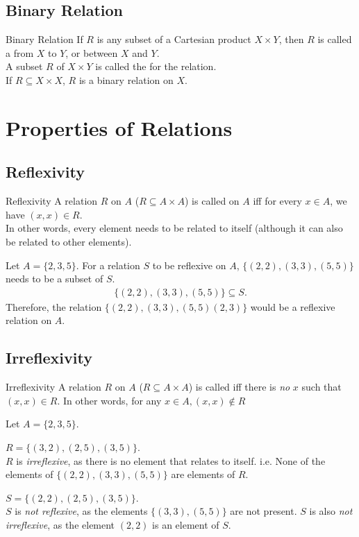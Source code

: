\documentclass[\main/notes.tex]{subfiles}
\begin{document}
			\subsection{Binary Relation}
				\begin{definition}{Binary Relation}
					If $R$ is any subset of a Cartesian product $X \times Y$, then $R$ is called a  from $X$ to $Y$, or between $X$ and $Y$.\\
					A subset $R$ of $X \times Y$ is called the  for the relation.\\
					If $R \subseteq X \times X$, $R$ is a binary relation on $X$.
				\end{definition}
			\pagebreak
		\section{Properties of Relations}
			\subsection{Reflexivity}
			\begin{definition}{Reflexivity}
				A relation $R$ on $A$ ($R \subseteq A \times A$) is called  on $A$ iff for every $x \in A$, we have $(x, x) \in R$.\\
				In other words, every element needs to be related to itself (although it can also be related to other elements).
			\end{definition}
				\begin{example}
					Let $A = \{2, 3, 5\}$. For a relation $S$ to be reflexive on $A$, $\bigl\{(2, 2), (3, 3), (5, 5)\bigr\}$ needs to be a subset of $S$.
						\begin{align*}
							\bigl\{(2, 2), (3, 3), (5, 5)\bigr\} \subseteq S.
						\end{align*}
					Therefore, the relation $\bigl\{(2, 2), (3, 3), (5, 5) (2, 3)\bigr\}$ would be a reflexive relation on $A$.
				\end{example}
			\subsection{Irreflexivity}
				\begin{definition}{Irreflexivity}
					A relation $R$ on $A$ ($R \subseteq A \times A$) is called  iff there is \emph{no} $x$ such that $(x, x) \in R$. In other words, for any $x \in A, (x, x) \notin R$
				\end{definition}
				\begin{example}
					Let $A = \{2, 3, 5\}$.

					$R = \bigl\{(3, 2), (2, 5), (3, 5)\bigr\}$.\\
					$R$ is \emph{irreflexive}, as there is no element that relates to itself. i.e. None of the elements of $\bigl\{(2, 2), (3, 3), (5, 5)\bigr\}$ are elements of $R$.

					$S = \bigl\{(2, 2), (2, 5), (3, 5)\bigr\}$.\\
					$S$ is \emph{not reflexive}, as the elements $\bigl\{(3, 3), (5, 5)\bigr\}$ are not present. $S$ is also \emph{not irreflexive}, as the element $(2, 2)$ is an element of $S$.
				\end{example}
\end{document}
